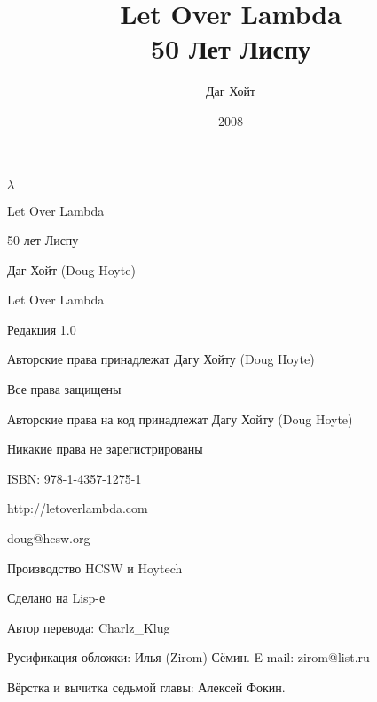 \documentclass[a4paper, 12pt]{book}
\title{Let Over Lambda \\50 Лет Лиспу}
\date{2008}
\author{Даг Хойт}
\begin{document}
\newcommand{\listbegin} {\hrule}
\newcommand{\listend} {\hrule\vspace{0.1cm}}








\renewcommand {\contentsname} {Оглавление}
\renewcommand {\chaptername} {Глава}
%
\maketitle
\begin{center}
{\LARGE $\lambda$}


Let Over Lambda

50 лет Лиспу

Даг Хойт (Doug Hoyte)

Let Over Lambda

Редакция 1.0

Авторские права принадлежат Дагу Хойту (Doug Hoyte)

Все права защищены

Авторские права на код принадлежат Дагу Хойту (Doug Hoyte)

Никакие права не зарегистрированы

ISBN: 978-1-4357-1275-1

http://letoverlambda.com

doug@hcsw.org

Производство HCSW и Hoytech

Сделано на Lisp-е

Автор перевода: Charlz\_Klug

Русификация обложки: Илья (Zirom) Сёмин. E-mail: zirom@list.ru

Вёрстка и вычитка седьмой главы: Алексей Фокин.
\end{center}
\tableofcontents








\newpage 

\end{document}
